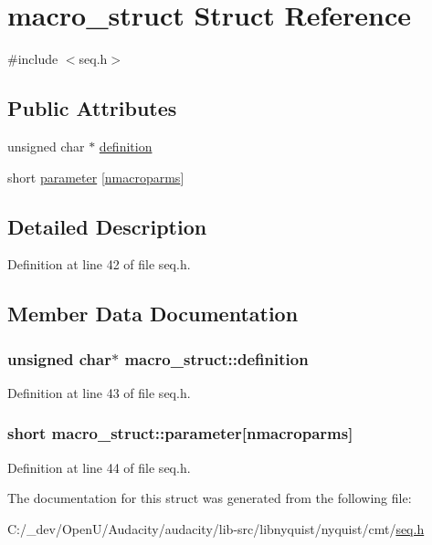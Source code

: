 \hypertarget{structmacro__struct}{}\section{macro\+\_\+struct Struct Reference}
\label{structmacro__struct}


{\ttfamily \#include $<$seq.\+h$>$}

\subsection*{Public Attributes}
\begin{DoxyCompactItemize}
\item 
unsigned char $\ast$ \hyperlink{structmacro__struct_a184bddb0a364ce6b35098937830fcd91}{definition}
\item 
short \hyperlink{structmacro__struct_a879ef21de7afd7436c4631ea795e4a75}{parameter} \mbox{[}\hyperlink{seq_8h_a7418f9520fdd7e58676d5b51a24a6bab}{nmacroparms}\mbox{]}
\end{DoxyCompactItemize}


\subsection{Detailed Description}


Definition at line 42 of file seq.\+h.



\subsection{Member Data Documentation}
\subsubsection[{\texorpdfstring{definition}{definition}}]{\setlength{\rightskip}{0pt plus 5cm}unsigned char$\ast$ macro\+\_\+struct\+::definition}\hypertarget{structmacro__struct_a184bddb0a364ce6b35098937830fcd91}{}\label{structmacro__struct_a184bddb0a364ce6b35098937830fcd91}


Definition at line 43 of file seq.\+h.

\subsubsection[{\texorpdfstring{parameter}{parameter}}]{\setlength{\rightskip}{0pt plus 5cm}short macro\+\_\+struct\+::parameter\mbox{[}{\bf nmacroparms}\mbox{]}}\hypertarget{structmacro__struct_a879ef21de7afd7436c4631ea795e4a75}{}\label{structmacro__struct_a879ef21de7afd7436c4631ea795e4a75}


Definition at line 44 of file seq.\+h.



The documentation for this struct was generated from the following file\+:\begin{DoxyCompactItemize}
\item 
C\+:/\+\_\+dev/\+Open\+U/\+Audacity/audacity/lib-\/src/libnyquist/nyquist/cmt/\hyperlink{seq_8h}{seq.\+h}\end{DoxyCompactItemize}
